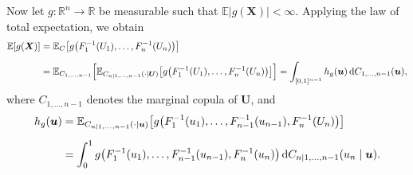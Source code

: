 \documentclass[12pt]{article}
\begin{document}
Now let
$g:\mathbb R^n\to\mathbb R$
be measurable such that
$\mathbb E|g(\boldsymbol X)|<\infty$.
Applying the law of total expectation, we obtain
\begin{align*}
	\mathbb E[g(\boldsymbol X)]
	&=
	\mathbb E_C
	\!\left[
	g\!\left(
	F_1^{-1}(U_1),\ldots,F_n^{-1}(U_n)
	\right)
	\right]
	\\[0.2cm]
	&=
	\mathbb E_{C_{1,\ldots,n-1}}
	\!\left[
	\mathbb E_{C_{n\mid1,\ldots,n-1}(\cdot\mid\boldsymbol U)}
	\!\left[
	g\!\left(
	F_1^{-1}(U_1),\ldots,F_n^{-1}(U_n)
	\right)
	\right]
	\right]
=
	\int_{[0,1]^{n-1}}
	h_g(\boldsymbol u)\,
	{\rm d}C_{1,\ldots,n-1}(\boldsymbol u),
\end{align*}
where
$C_{1,\ldots,n-1}$ denotes the marginal copula of $\boldsymbol U$, and
\[
\begin{aligned}
	h_g(\boldsymbol u)
	&=
	\mathbb E_{C_{n\mid1,\ldots,n-1}(\cdot\mid\boldsymbol u)}
	\!\left[
	g\!\left(
	F_1^{-1}(u_1),\ldots,
	F_{n-1}^{-1}(u_{n-1}),
	F_n^{-1}(U_n)
	\right)
	\right]
	\\[0.2cm]
	&=
	\int_0^1
	g\!\left(
	F_1^{-1}(u_1),\ldots,
	F_{n-1}^{-1}(u_{n-1}),
	F_n^{-1}(u_n)
	\right)
	{\rm d}C_{n\mid1,\ldots,n-1}(u_n\mid\boldsymbol u).
\end{aligned}
\]
\end{document}
